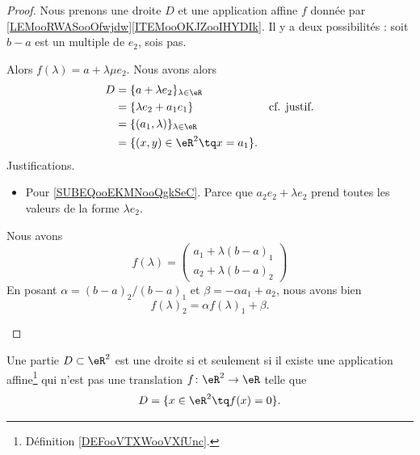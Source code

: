 \begin{proof}
	Nous prenons une droite \( D\) et une application affine \( f\) donnée par \eqref{LEMooRWASooOfwjdw}\ref{ITEMooOKJZooIHYDIk}. Il y a deux possibilités : soit \( b-a\) est un multiple de \( e_2\), sois pas.
	\begin{subproof}
		\spitem[Si \( b-a=\mu e_2\)]
		Alors \( f(\lambda)=a+\lambda\mu e_2\). Nous avons alors
		\begin{subequations}
			\begin{align}
				D & =\{ a+\lambda e_2 \}_{\lambda\in \eR}                                                    \\
				  & =	\{ \lambda e_2+a_1e_1 \}             & \text{cf. justif.}		\label{SUBEQooEKMNooQgkSeC} \\
				  & = \{ (a_1,\lambda) \}_{\lambda\in \eR}                                                   \\\
				  & =\{ (x,y)\in \eR^2\tq x=a_1 \}.
			\end{align}
		\end{subequations}
		Justifications.
		\begin{itemize}
			\item
			      Pour \ref{SUBEQooEKMNooQgkSeC}. Parce que \( a_2e_2+\lambda e_2\) prend toutes les valeurs de la forme \( \lambda e_2\).
		\end{itemize}
		\spitem[Sinon]
		Nous avons
		\begin{equation}
			f(\lambda)=\begin{pmatrix}
				a_1+\lambda(b-a)_1 \\
				a_2+\lambda(b-a)_2
			\end{pmatrix}
		\end{equation}
		En posant \( \alpha=(b-a)_2/(b-a)_1\) et \( \beta=-\alpha a_1+a_2\), nous avons bien
		\begin{equation}
			f(\lambda)_2=\alpha f(\lambda)_1+\beta.
		\end{equation}
	\end{subproof}
\end{proof}

\begin{proposition}     \label{PROPooOFKXooARiQZK}
	Une partie \( D\subset \eR^2\) est une droite si et seulement si il existe une application affine\footnote{Définition \ref{DEFooVTXWooVXfUnc}.} qui n'est pas une translation \( f\colon \eR^2\to \eR\) telle que
	\begin{equation}
		D=\{ x\in \eR^2\tq f(x)=0 \}.
	\end{equation}
\end{proposition}


